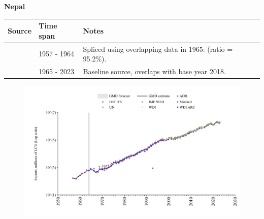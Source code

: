 \documentclass[12pt,a4paper,landscape]{article}
\begin{document}
\begin{adjustbox}{max totalsize={\paperwidth}{\paperheight},center}
\begin{minipage}[t][\textheight][t]{\textwidth}
\vspace*{0.5cm}
{}
\begin{center}
{\Large\bfseries Nepal}
\end{center}
\vspace{0.5cm}
\begin{table}[H]
\centering
\small
\begin{tabular}{|l|l|l|}
\hline
\textbf{Source} & \textbf{Time span} & \textbf{Notes} \\
\hline
\rowcolor{white}\cite{Mitchell}& 1957 - 1964 &Spliced using overlapping data in 1965: (ratio = 95.2\%).\\
\rowcolor{lightgray}\cite{WDI}& 1965 - 2023 &Baseline source, overlaps with base year 2018.\\
\hline
\end{tabular}
\end{table}
\begin{figure}[H]
\centering
\includegraphics[width=\textwidth,height=0.6\textheight,keepaspectratio]{graphs/NPL_imports.pdf}
\end{figure}
\end{minipage}
\end{adjustbox}
\end{document}
